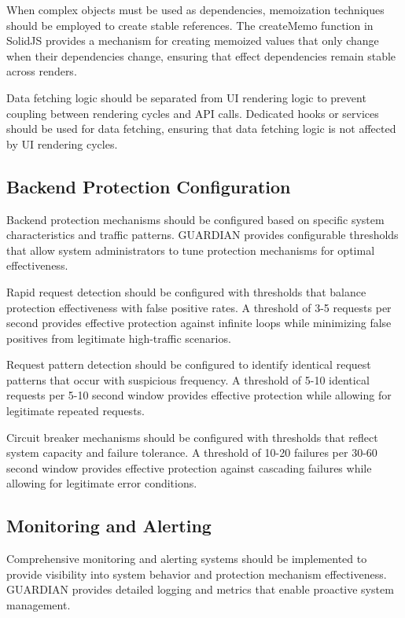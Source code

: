 \documentclass[10pt]{article}
\begin{document}
When complex objects must be used as dependencies, memoization techniques should be employed to create stable references. The createMemo function in SolidJS provides a mechanism for creating memoized values that only change when their dependencies change, ensuring that effect dependencies remain stable across renders.

Data fetching logic should be separated from UI rendering logic to prevent coupling between rendering cycles and API calls. Dedicated hooks or services should be used for data fetching, ensuring that data fetching logic is not affected by UI rendering cycles.

\subsection{Backend Protection Configuration}

Backend protection mechanisms should be configured based on specific system characteristics and traffic patterns. GUARDIAN provides configurable thresholds that allow system administrators to tune protection mechanisms for optimal effectiveness.

Rapid request detection should be configured with thresholds that balance protection effectiveness with false positive rates. A threshold of 3-5 requests per second provides effective protection against infinite loops while minimizing false positives from legitimate high-traffic scenarios.

Request pattern detection should be configured to identify identical request patterns that occur with suspicious frequency. A threshold of 5-10 identical requests per 5-10 second window provides effective protection while allowing for legitimate repeated requests.

Circuit breaker mechanisms should be configured with thresholds that reflect system capacity and failure tolerance. A threshold of 10-20 failures per 30-60 second window provides effective protection against cascading failures while allowing for legitimate error conditions.

\subsection{Monitoring and Alerting}

Comprehensive monitoring and alerting systems should be implemented to provide visibility into system behavior and protection mechanism effectiveness. GUARDIAN provides detailed logging and metrics that enable proactive system management.
\end{document}
